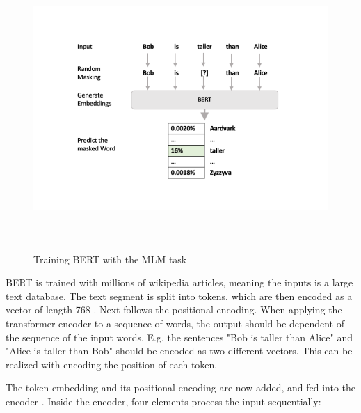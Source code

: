           
             \begin{figure}[h!]
             	
             	\centering
             	\includegraphics[height=10cm]{ Bilder/preprocessing/BERT/BERT-language-modeling-masked-lm.png}
             	\label{fig:mlm}
             	\caption[Training BERT with the MLM task]{Training BERT with the MLM task \cite{alammarIllustratedBERTELMo}}
             \end{figure}
            
         
               BERT is trained with millions of wikipedia articles, meaning the inputs is a large text database. The text segment is split into tokens, which are then encoded as a vector of length 768 \cite{BERTEmbeddingLayer}. Next follows the positional encoding. When applying the transformer encoder to a sequence of words, the output should be dependent of the sequence of the input words. E.g. the sentences "Bob is taller than Alice" and "Alice is taller than Bob" should be encoded as two different vectors. This can be realized with encoding the position of each token. 
               

               
               The token embedding and its positional encoding are now added, and fed into the encoder \cite{illustratedTransformer}. Inside the encoder, four elements process the input sequentially:
               
